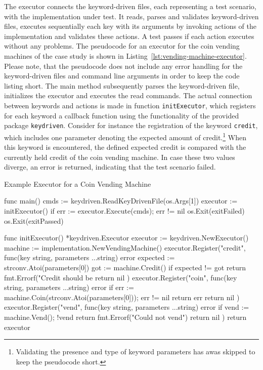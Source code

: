 The executor connects the keyword-driven files, each representing a test scenario, with the implementation under test. It reads, parses and validates keyword-driven files, executes sequentially each key with its arguments by invoking actions of the implementation and validates these actions. A test passes if each action executes without any problems. The pseudocode for an executor for the coin vending machines of the case study is shown in Listing~\ref{lst:vending-machine-executor}. Please note, that the pseudocode does not include any error handling for the keyword-driven files and command line arguments in order to keep the code listing short. The main method subsequently parses the keyword-driven file, initializes the executor and executes the read commands. The actual connection between keywords and actions is made in function \texttt{initExecutor}, which registers for each keyword a callback function using the functionality of the provided package \texttt{keydriven}. Consider for instance the registration of the keyword \texttt{credit}, which includes one parameter denoting the expected amount of credit.\footnote{Validating the presence and type of keyword parameters has awas skipped to keep the pseudocode short.} When this keyword is encountered, the defined expected credit is compared with the currently held credit of the coin vending machine. In case these two values diverge, an error is returned, indicating that the test scenario failed.

\begin{listing}[hb]
\caption{Example Executor for a Coin Vending Machine}
\label{lst:vending-machine-executor}
\begin{gocode}
func main() {
  cmds := keydriven.ReadKeyDrivenFile(os.Args[1])
  executor := initExecutor()
  if err := executor.Execute(cmds); err != nil {
    os.Exit(exitFailed)
  }
  os.Exit(exitPassed)
}

func initExecutor() *keydriven.Executor {
  executor := keydriven.NewExecutor()
  machine := implementation.NewVendingMachine()
  executor.Register("credit", func(key string, parameters ...string) error {
    expected := strconv.Atoi(parameters[0])
    got := machine.Credit()
    if expected != got {
      return fmt.Errorf("Credit should be %
    }
    return nil
  })
  executor.Register("coin", func(key string, parameters ...string) error {
    if err := machine.Coin(strconv.Atoi(parameters[0])); err != nil {
      return err
    }
    return nil
  })
  executor.Register("vend", func(key string, parameters ...string) error {
    if vend := machine.Vend(); !vend {
      return fmt.Errorf("Could not vend")
    }
    return nil
  })
  return executor
}
\end{gocode}
\end{listing}

